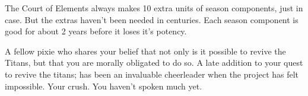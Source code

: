 \documentclass[char]{PP}
\begin{document}
\begin{itemz}[Notes]
	\item The Court of Elements always makes 10 extra units of season components, just in case. But the extras haven't been needed in centuries. Each season component is good for about 2 years before it loses it's potency.
\end{itemz}

\begin{contacts}
	\contact{\cFTitan{}} A fellow pixie who shares your belief that not only is it possible to revive the Titans, but that you are morally obligated to do so.
	\contact{\cEAirship{}} A late addition to your quest to revive the titans; \cEAirship{} has been an invaluable cheerleader when the project has felt impossible.
	\contact{\cMAirship{}} Your crush. You haven’t spoken much yet.
\end{contacts}
\end{document}
